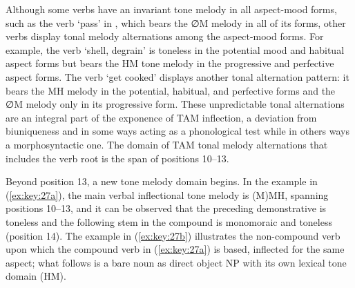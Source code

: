 \documentclass[output=paper]{langscibook}
\begin{document}
Although some verbs have an invariant tone melody in all aspect-mood forms, such as the verb `pass' in , which bears the ∅M melody in all of its forms, other verbs display tonal melody alternations among the aspect-mood forms. For example, the verb `shell, degrain' is toneless in the potential mood and habitual aspect forms but bears the HM tone melody in the progressive and perfective aspect forms. The verb `get cooked' displays another tonal alternation pattern: it bears the MH melody in the potential, habitual, and perfective forms and the ∅M melody only in its progressive form. These unpredictable tonal alternations are an integral part of the exponence of TAM inflection, a deviation from biuniqueness and in some ways acting as a phonological test while in others ways a morphosyntactic one. The domain of TAM tonal melody alternations that includes the verb root is the span of positions 10--13.

\begin{table}
    \caption{Tonal alternations in TAM inflection}
    \label{tab:zenz:key:3}
\end{table}

Beyond position 13, a new tone melody domain begins. In the example in (\ref{ex:key:27a}), the main verbal inflectional tone melody is (M)MH, spanning positions 10{}--13, and it can be observed that the preceding demonstrative is toneless and the following stem in the compound is monomoraic and toneless (position 14). The example in (\ref{ex:key:27b}) illustrates the non-compound verb upon which the compound verb in (\ref{ex:key:27a}) is based, inflected for the same aspect; what follows is a bare noun as direct object NP with its own lexical tone domain (HM).
\end{document}
